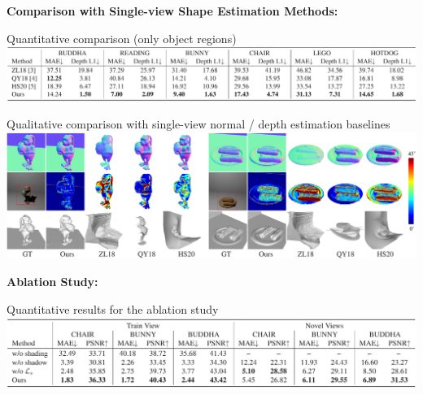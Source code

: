 \documentclass[landscape,a0paper,fontscale=0.292]{baposter}
\begin{document}
\begin{poster}
{\begin{minipage}[t]{0.49\textwidth}
        \vspace{-0.6em}
        \textbf{\color{ctitle}Comparison with Single-view Shape Estimation Methods:}
        \vspace{-0.7em}
        \begin{center}
            Quantitative comparison (only object regions)\\
            \includegraphics[width=\textwidth]{images/table_baseline_ps.pdf}
        \end{center}
        \vspace{-1.8em}
        \begin{center}
            Qualitative comparison with single-view normal / depth estimation baselines \\
            \includegraphics[width=\textwidth]{images/fig_baseline_ps.pdf} 
        \end{center}
    \end{minipage}\hfill
    \begin{minipage}[t]{0.49\textwidth}
        \textbf{\color{ctitle}Ablation Study:} 
        \vspace{-0.8em}
        \begin{center}
            Quantitative results for the ablation study\\
            \includegraphics[align=c,width=\textwidth]{images/table_ablation.pdf} 

\end{center}
\end{minipage}}
\end{poster}
\end{document}
